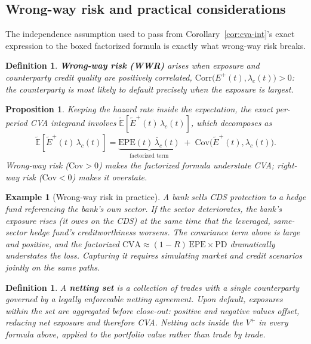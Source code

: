 \documentclass{report}
\theoremstyle{spacedplain}
\newtheorem{proposition}[theorem]{Proposition}
\theoremstyle{spaceddefinition}
\newtheorem{definition}[theorem]{Definition}
\newtheorem{example}[theorem]{Example}
\theoremstyle{spacedremark}
\begin{document}
\subsection{Wrong-way risk and practical considerations}\label{sec:wwr}

The independence assumption used to pass from Corollary~\ref{cor:cva-int}'s exact expression to the boxed factorized formula is exactly what wrong-way risk breaks.

\begin{definition}
\textbf{Wrong-way risk (WWR)} arises when exposure and counterparty credit quality are positively correlated,
$\text{Corr}\big(E^+(t),\lambda_c(t)\big) > 0$: the counterparty is most likely to default precisely when the exposure is largest.
\end{definition}

\begin{proposition}
Keeping the hazard rate inside the expectation, the exact per-period CVA integrand involves $\widetilde{\mathbb{E}}[\widetilde{E}^+(t)\,\lambda_c(t)]$, which decomposes as
\begin{align}
    \widetilde{\mathbb{E}}[\widetilde{E}^+(t)\,\lambda_c(t)]
    = \underbrace{\text{EPE}(t)\,\bar\lambda_c(t)}_{\text{factorized term}}
    \;+\;\text{Cov}\big(\widetilde{E}^+(t),\lambda_c(t)\big).
\end{align}
Wrong-way risk ($\text{Cov}>0$) makes the factorized formula \emph{understate} CVA; right-way risk ($\text{Cov}<0$) makes it overstate.
\end{proposition}

\begin{example}[Wrong-way risk in practice]
A bank sells CDS protection to a hedge fund referencing the bank's own sector. If the sector deteriorates, the bank's exposure rises (it owes on the CDS) at the same time that the leveraged, same-sector hedge fund's creditworthiness worsens. The covariance term above is large and positive, and the factorized $\text{CVA}\approx(1-R)\,\text{EPE}\times\text{PD}$ dramatically understates the loss. Capturing it requires simulating market and credit scenarios \emph{jointly on the same paths}.
\end{example}

\begin{definition}
A \textbf{netting set} is a collection of trades with a single counterparty governed by a legally enforceable netting agreement. Upon default, exposures within the set are aggregated before close-out: positive and negative values offset, reducing net exposure and therefore CVA. Netting acts inside the $V^+$ in every formula above, applied to the portfolio value rather than trade by trade.
\end{definition}
\end{document}
